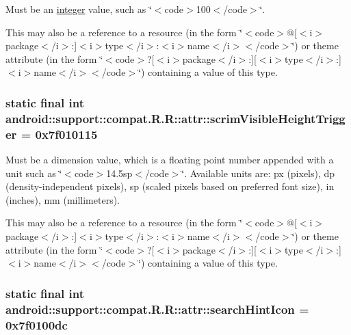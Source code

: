 Must be an \hyperlink{classandroid_1_1support_1_1compat_1_1_r_1_1integer}{integer} value, such as \char`\"{}$<$code$>$100$<$/code$>$\char`\"{}. 

This may also be a reference to a resource (in the form \char`\"{}$<$code$>$@\mbox{[}$<$i$>$package$<$/i$>$:\mbox{]}$<$i$>$type$<$/i$>$:$<$i$>$name$<$/i$>$$<$/code$>$\char`\"{}) or theme attribute (in the form \char`\"{}$<$code$>$?\mbox{[}$<$i$>$package$<$/i$>$:\mbox{]}\mbox{[}$<$i$>$type$<$/i$>$:\mbox{]}$<$i$>$name$<$/i$>$$<$/code$>$\char`\"{}) containing a value of this type. \hypertarget{classandroid_1_1support_1_1compat_1_1_r_1_1attr_1ad7a41536be8302fe819c15408c2136}{
\subsubsection[{scrimVisibleHeightTrigger}]{\setlength{\rightskip}{0pt plus 5cm}static final int android::support::compat.R.R::attr::scrimVisibleHeightTrigger = 0x7f010115}}
\label{classandroid_1_1support_1_1compat_1_1_r_1_1attr_1ad7a41536be8302fe819c15408c2136}


Must be a dimension value, which is a floating point number appended with a unit such as \char`\"{}$<$code$>$14.5sp$<$/code$>$\char`\"{}. Available units are: px (pixels), dp (density-independent pixels), sp (scaled pixels based on preferred font size), in (inches), mm (millimeters). 

This may also be a reference to a resource (in the form \char`\"{}$<$code$>$@\mbox{[}$<$i$>$package$<$/i$>$:\mbox{]}$<$i$>$type$<$/i$>$:$<$i$>$name$<$/i$>$$<$/code$>$\char`\"{}) or theme attribute (in the form \char`\"{}$<$code$>$?\mbox{[}$<$i$>$package$<$/i$>$:\mbox{]}\mbox{[}$<$i$>$type$<$/i$>$:\mbox{]}$<$i$>$name$<$/i$>$$<$/code$>$\char`\"{}) containing a value of this type. \hypertarget{classandroid_1_1support_1_1compat_1_1_r_1_1attr_65a8bc46bb28b1486c2ede833650f758}{
\subsubsection[{searchHintIcon}]{\setlength{\rightskip}{0pt plus 5cm}static final int android::support::compat.R.R::attr::searchHintIcon = 0x7f0100dc}}
\label{classandroid_1_1support_1_1compat_1_1_r_1_1attr_65a8bc46bb28b1486c2ede833650f758}


